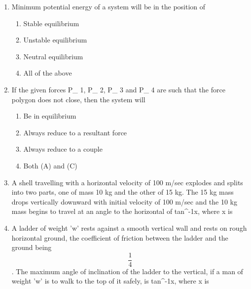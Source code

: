 \documentclass[11pt,a4paper]{article}
\begin{document}
\begin{enumerate}
\item{Minimum potential energy of a system will be in the position of}
\begin{enumerate}[label=\Alph*.]
\item{Stable equilibrium}
\item{Unstable equilibrium}
\item{Neutral equilibrium}
\item{All of the above}
\end{enumerate}
\item{If the given forces P\_ 1, P\_ 2, P\_ 3 and P\_ 4 are such that the force polygon does not close, then the system will
}
\begin{enumerate}[label=\Alph*.]
\item{Be in equilibrium}
\item{Always reduce to a resultant force}
\item{Always reduce to a couple}
\item{Both (A) and (C)}
\end{enumerate}
\item{A shell travelling with a horizontal velocity of 100 m/sec explodes and splits into two parts, one of mass 10 kg and the other of 15 kg. The 15 kg mass drops vertically downward with initial velocity of 100 m/sec and the 10 kg mass begins to travel at an angle to the horizontal of tan\^{}-1x, where x is
}
\\
\item{A ladder of weight 'w' rests against a smooth vertical wall and rests on rough horizontal ground, the coefficient of friction between the ladder and the ground being $$\frac{1}{4}$$. The maximum angle of inclination of the ladder to the vertical, if a man of weight 'w' is to walk to the top of it safely, is tan\^{}-1x, where x is}

\end{enumerate}
\end{document}

